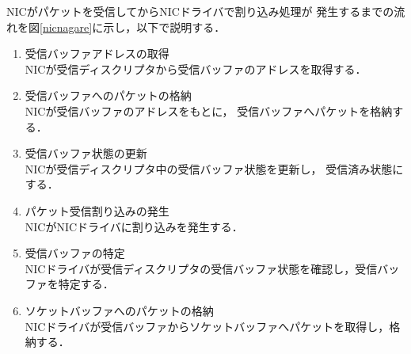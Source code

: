 \documentclass[tanilab-enum]{graduate}
\begin{document}
NICがパケットを受信してからNICドライバで割り込み処理が
発生するまでの流れを図\ref{nicnagare}に示し，以下で説明する．
\begin{enumerate}
    \item 受信バッファアドレスの取得\\
        NICが受信ディスクリプタから受信バッファのアドレスを取得する．
    \item 受信バッファへのパケットの格納\\
        NICが受信バッファのアドレスをもとに，
        受信バッファへパケットを格納する．
    \item 受信バッファ状態の更新\\
        NICが受信ディスクリプタ中の受信バッファ状態を更新し，
        受信済み状態にする．
    \item パケット受信割り込みの発生\\
        NICがNICドライバに割り込みを発生する．
    \item 受信バッファの特定\\
        NICドライバが受信ディスクリプタの受信バッファ状態を確認し，受信バッファを特定する．
    \item ソケットバッファへのパケットの格納\\
        NICドライバが受信バッファからソケットバッファへパケットを取得し，格納する．
\end{enumerate}
\end{document}
